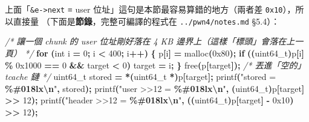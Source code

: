 \documentclass[10pt,a4paper]{article}
\newenvironment{Shaded}{\begin{snugshade}}{\end{snugshade}}
\newcommand{\BaseNTok}[1]{\textcolor[rgb]{0.00,0.00,0.81}{#1}}
\newcommand{\CommentTok}[1]{\textcolor[rgb]{0.56,0.35,0.01}{\textit{#1}}}
\newcommand{\ControlFlowTok}[1]{\textcolor[rgb]{0.13,0.29,0.53}{\textbf{#1}}}
\newcommand{\DataTypeTok}[1]{\textcolor[rgb]{0.13,0.29,0.53}{#1}}
\newcommand{\DecValTok}[1]{\textcolor[rgb]{0.00,0.00,0.81}{#1}}
\newcommand{\NormalTok}[1]{#1}
\newcommand{\OperatorTok}[1]{\textcolor[rgb]{0.81,0.36,0.00}{\textbf{#1}}}
\newcommand{\SpecialCharTok}[1]{\textcolor[rgb]{0.81,0.36,0.00}{\textbf{#1}}}
\newcommand{\StringTok}[1]{\textcolor[rgb]{0.31,0.60,0.02}{#1}}
\renewenvironment{Shaded}{%
  \def\FrameCommand{\fboxsep=3.2pt\colorbox{shadecolor}}%
  \MakeFramed{\advance\hsize-\width\FrameRestore\small}%
}{%
  \endMakeFramed
}
\begin{document}
上面「\texttt{\&\allowbreak{}e-\allowbreak{}\textgreater{}\allowbreak{}next} ≡ user
位址」這句是本節最容易算錯的地方（兩者差 \texttt{0x10}），所以直接量
（下面是\textbf{節錄}，完整可編譯的程式在 \texttt{../\allowbreak{}pwn4/\allowbreak{}notes.\allowbreak{}md}
§5.4）：

\begin{Shaded}
\begin{Highlighting}[]
\CommentTok{/* 讓一個 chunk 的 user 位址剛好落在 4 KB 邊界上（這樣「標頭」會落在上一頁） */}
\ControlFlowTok{for} \OperatorTok{(}\DataTypeTok{int}\NormalTok{ i }\OperatorTok{=} \DecValTok{0}\OperatorTok{;}\NormalTok{ i }\OperatorTok{\textless{}} \DecValTok{400}\OperatorTok{;}\NormalTok{ i}\OperatorTok{++)} \OperatorTok{\{}
\NormalTok{    p}\OperatorTok{[}\NormalTok{i}\OperatorTok{]} \OperatorTok{=}\NormalTok{ malloc}\OperatorTok{(}\BaseNTok{0x80}\OperatorTok{);}
    \ControlFlowTok{if} \OperatorTok{((}\DataTypeTok{uint64\_t}\OperatorTok{)}\NormalTok{p}\OperatorTok{[}\NormalTok{i}\OperatorTok{]} \OperatorTok{\%} \BaseNTok{0x1000} \OperatorTok{==} \DecValTok{0} \OperatorTok{\&\&}\NormalTok{ target }\OperatorTok{\textless{}} \DecValTok{0}\OperatorTok{)}\NormalTok{ target }\OperatorTok{=}\NormalTok{ i}\OperatorTok{;}
\OperatorTok{\}}
\NormalTok{free}\OperatorTok{(}\NormalTok{p}\OperatorTok{[}\NormalTok{target}\OperatorTok{]);}                                   \CommentTok{/* 丟進「空的」tcache 鏈 */}
\DataTypeTok{uint64\_t}\NormalTok{ stored }\OperatorTok{=} \OperatorTok{*(}\DataTypeTok{uint64\_t} \OperatorTok{*)}\NormalTok{p}\OperatorTok{[}\NormalTok{target}\OperatorTok{];}
\NormalTok{printf}\OperatorTok{(}\StringTok{"stored      = }\SpecialCharTok{\%\#018lx\textbackslash{}n}\StringTok{"}\OperatorTok{,}\NormalTok{ stored}\OperatorTok{);}
\NormalTok{printf}\OperatorTok{(}\StringTok{"user   \textgreater{}\textgreater{}12 = }\SpecialCharTok{\%\#018lx\textbackslash{}n}\StringTok{"}\OperatorTok{,} \OperatorTok{(}\DataTypeTok{uint64\_t}\OperatorTok{)}\NormalTok{p}\OperatorTok{[}\NormalTok{target}\OperatorTok{]} \OperatorTok{\textgreater{}\textgreater{}} \DecValTok{12}\OperatorTok{);}
\NormalTok{printf}\OperatorTok{(}\StringTok{"header \textgreater{}\textgreater{}12 = }\SpecialCharTok{\%\#018lx\textbackslash{}n}\StringTok{"}\OperatorTok{,} \OperatorTok{((}\DataTypeTok{uint64\_t}\OperatorTok{)}\NormalTok{p}\OperatorTok{[}\NormalTok{target}\OperatorTok{]} \OperatorTok{{-}} \BaseNTok{0x10}\OperatorTok{)} \OperatorTok{\textgreater{}\textgreater{}} \DecValTok{12}\OperatorTok{);}
\end{Highlighting}
\end{Shaded}
\end{document}
